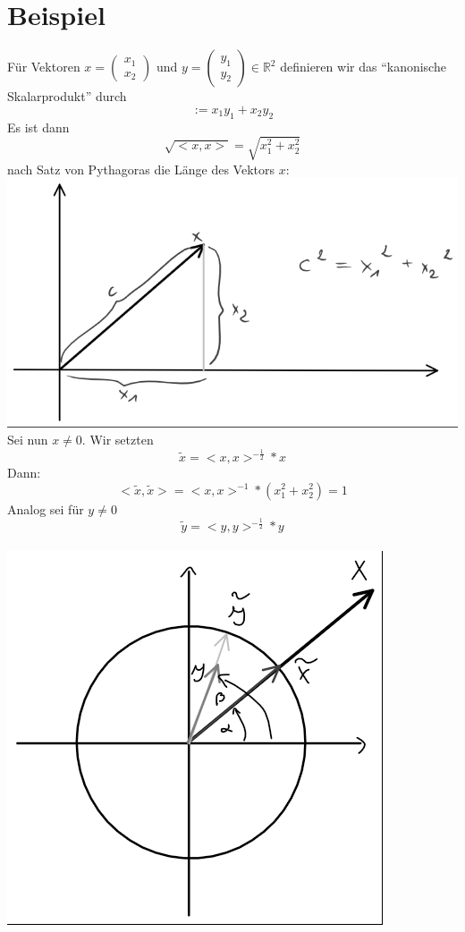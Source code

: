 \documentclass{scrbook}
\begin{document}
\section{Beispiel}
Für Vektoren $x =\left(
\begin{array}{c}
x_1\\x_2
\end{array}
\right)$ und $y =\left(
\begin{array}{c}
y_1\\y_2
\end{array}
\right) \in \mathbb{R}^2$ definieren wir das "`kanonische Skalarprodukt"' durch\[<x,y> := x_1y_1+x_2y_2\]
Es ist dann
\[\sqrt{<x,x>} = \sqrt{x_1^2+x_2^2}\]
nach Satz von Pythagoras die Länge des Vektors $x$:
\\\includegraphics{Graph2.png}
\\
Sei nun $x\neq 0$. Wir setzten
\[\tilde{x} = <x,x>^{-\frac{1}{2}}*x\]
Dann:
\[<\tilde{x},\tilde{x}> = <x,x>^{-1} *(x_1^2+x_2^2) = 1\]
Analog sei für $y\neq 0$
\[\tilde{y} = <y,y>^{-\frac{1}{2}}*y\]
\\\includegraphics{Graph3.png}
\end{document}
